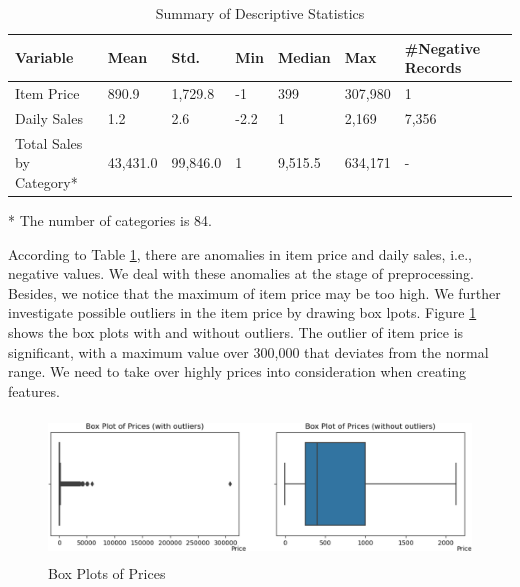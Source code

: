 \documentclass{article}
\begin{document}
\begin{table}[!ht]
    \centering
    \caption{Summary of Descriptive Statistics}
    \label{tab:de-stat}
    \begin{threeparttable}
    \begin{tabular}{llllllll}
        \toprule
        \textbf{Variable} & \textbf{Mean} & \textbf{Std.} & \textbf{Min} & \textbf{Median} & \textbf{Max} & \textbf{\#Negative Records}\\
        \midrule
        Item Price & 890.9 & 1,729.8 & -1 & 399 & 307,980 & 1\\
        Daily Sales & 1.2 & 2.6 & -2.2 & 1 & 2,169 & 7,356\\
        Total Sales by Category* & 43,431.0 & 99,846.0 & 1 & 9,515.5 & 634,171 & -\\
        \bottomrule
    \end{tabular}
    \begin{tablenotes}
        \footnotesize
        \item[*] The number of categories is 84.
    \end{tablenotes}
    \end{threeparttable}
\end{table}

According to Table \ref{tab:de-stat}, there are anomalies in item price and daily sales, i.e., negative values. We deal with these anomalies at the stage of preprocessing. Besides, we notice that the maximum of item price may be too high. We further investigate possible outliers in the item price by drawing box lpots. Figure \ref{fig:price-box} shows the box plots with and without outliers. The outlier of item price is significant, with a maximum value over 300,000 that deviates from the normal range. We need to take over highly prices into consideration when creating features. 

\begin{figure}[!ht]
    \centering
    \includegraphics[width=14cm, height=3.8cm]{./figs/price-box.png}
    \caption{Box Plots of Prices}
    \label{fig:price-box}
\end{figure}
\end{document}
